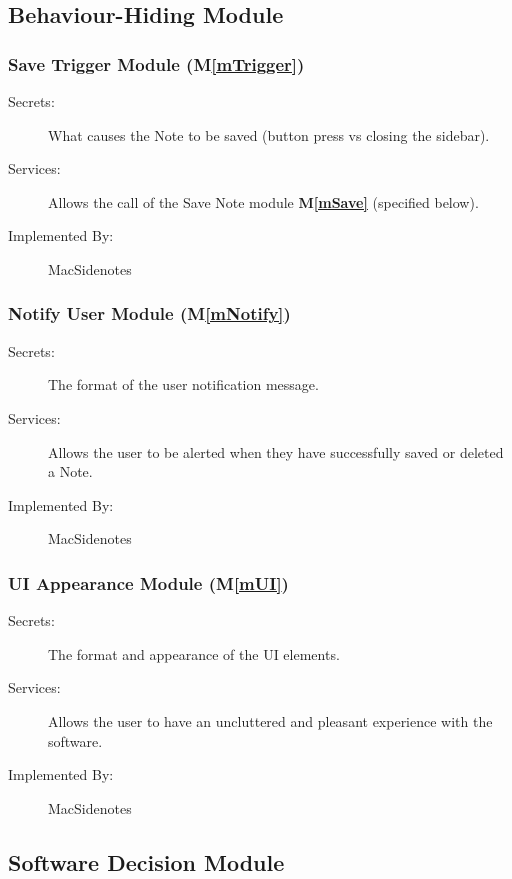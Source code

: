 \documentclass[12pt, titlepage]{article}
\newcommand{\mref}[1]{M\ref{#1}}
\begin{document}
\subsection{Behaviour-Hiding Module}

\subsubsection{Save Trigger Module (\mref{mTrigger})}

\begin{description}
\item[Secrets:]What causes the Note to be saved (button press vs closing the 
sidebar).
\item[Services:]Allows the call of the Save Note module \textbf{\mref{mSave}} 
(specified below).
\item[Implemented By:] MacSidenotes
\end{description}

\subsubsection{Notify User Module (\mref{mNotify})}

\begin{description}
\item[Secrets:]The format of the user notification message.
\item[Services:]Allows the user to be alerted when they have successfully saved 
or deleted a Note.
\item[Implemented By:] MacSidenotes
\end{description}

\subsubsection{UI Appearance Module (\mref{mUI})}

\begin{description}
	\item[Secrets:]The format and appearance of the UI elements.
	\item[Services:]Allows the user to have an uncluttered and pleasant 
	experience with the software.
	\item[Implemented By:] MacSidenotes
\end{description}

\subsection{Software Decision Module}
\end{document}
